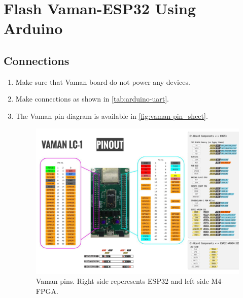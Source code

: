 \section{Flash Vaman-ESP32 Using Arduino}
\subsection{Connections}
\begin{enumerate}
\item Make sure that Vaman board do not power any devices.  
\item Make connections as shown in \autoref{tab:arduino-uart}.
\item The Vaman pin diagram is available in \autoref{fig:vaman-pin_sheet}.

\begin{figure}
\centering
\includegraphics[width=\columnwidth]{vaman-esp32/lcd/figs/pin_sheet.png}
\caption{Vaman pins.  Right side reperesents ESP32 and left side M4-FPGA.}
\label{fig:vaman-pin_sheet}
\end{figure}
\begin{table}[!ht]

\caption{}
\label{tab:arduino-uart}
\end{table}
\end{enumerate}
